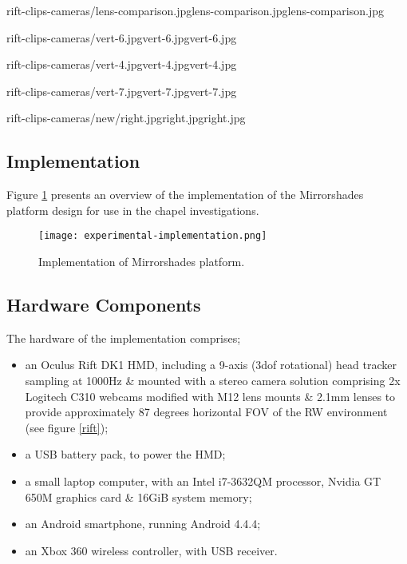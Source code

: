        {rift-clips-cameras/lens-comparison.jpg}{lens-comparison.jpg}{lens-comparison.jpg}

       {rift-clips-cameras/vert-6.jpg}{vert-6.jpg}{vert-6.jpg}

       {rift-clips-cameras/vert-4.jpg}{vert-4.jpg}{vert-4.jpg}

       {rift-clips-cameras/vert-7.jpg}{vert-7.jpg}{vert-7.jpg}

       {rift-clips-cameras/new/right.jpg}{right.jpg}{right.jpg}


\subsection{Implementation}
Figure \ref{experimentalimplementation} presents an overview of the implementation of the Mirrorshades platform design for use in the chapel investigations.

\begin{figure}[h]
	\thispagestyle{empty}
	\begin{center}
		\texttt{[image: experimental-implementation.png]}
		\caption{Implementation of Mirrorshades platform.}
		\label{experimentalimplementation}
	\end{center}
\end{figure}


\subsection{Hardware Components}
The hardware of the implementation comprises;

\begin{itemize}
	\item an Oculus Rift DK1 HMD, including a 9-axis (3dof rotational) head tracker sampling at 1000Hz \& mounted with a stereo camera solution comprising 2x Logitech C310 webcams modified with M12 lens mounts \& 2.1mm lenses to provide approximately 87 degrees horizontal FOV of the RW environment (see figure \ref{rift});
	\item a USB battery pack, to power the HMD;
	\item a small laptop computer, with an Intel i7-3632QM processor, Nvidia GT 650M graphics card \& 16GiB system memory;
	\item an Android smartphone, running Android 4.4.4;
	\item an Xbox 360 wireless controller, with USB receiver.
\end{itemize}

